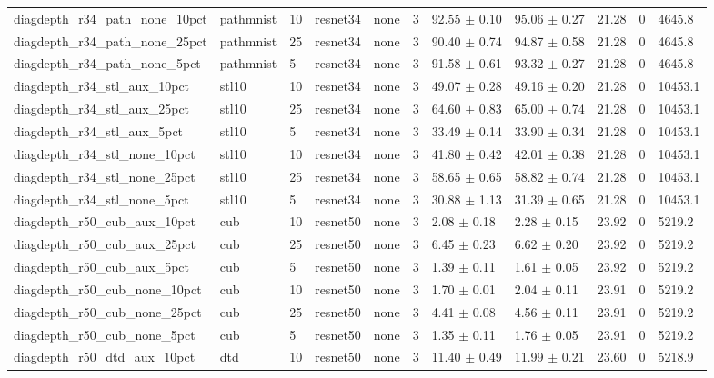\begin{tabular}{lllllllllll}
diagdepth_r34_path_none_10pct & pathmnist & 10 & resnet34 & none & 3 & 92.55 $\pm$ 0.10 & 95.06 $\pm$ 0.27 & 21.28 & 0 & 4645.8 \\
diagdepth_r34_path_none_25pct & pathmnist & 25 & resnet34 & none & 3 & 90.40 $\pm$ 0.74 & 94.87 $\pm$ 0.58 & 21.28 & 0 & 4645.8 \\
diagdepth_r34_path_none_5pct & pathmnist & 5 & resnet34 & none & 3 & 91.58 $\pm$ 0.61 & 93.32 $\pm$ 0.27 & 21.28 & 0 & 4645.8 \\
diagdepth_r34_stl_aux_10pct & stl10 & 10 & resnet34 & none & 3 & 49.07 $\pm$ 0.28 & 49.16 $\pm$ 0.20 & 21.28 & 0 & 10453.1 \\
diagdepth_r34_stl_aux_25pct & stl10 & 25 & resnet34 & none & 3 & 64.60 $\pm$ 0.83 & 65.00 $\pm$ 0.74 & 21.28 & 0 & 10453.1 \\
diagdepth_r34_stl_aux_5pct & stl10 & 5 & resnet34 & none & 3 & 33.49 $\pm$ 0.14 & 33.90 $\pm$ 0.34 & 21.28 & 0 & 10453.1 \\
diagdepth_r34_stl_none_10pct & stl10 & 10 & resnet34 & none & 3 & 41.80 $\pm$ 0.42 & 42.01 $\pm$ 0.38 & 21.28 & 0 & 10453.1 \\
diagdepth_r34_stl_none_25pct & stl10 & 25 & resnet34 & none & 3 & 58.65 $\pm$ 0.65 & 58.82 $\pm$ 0.74 & 21.28 & 0 & 10453.1 \\
diagdepth_r34_stl_none_5pct & stl10 & 5 & resnet34 & none & 3 & 30.88 $\pm$ 1.13 & 31.39 $\pm$ 0.65 & 21.28 & 0 & 10453.1 \\
diagdepth_r50_cub_aux_10pct & cub & 10 & resnet50 & none & 3 & 2.08 $\pm$ 0.18 & 2.28 $\pm$ 0.15 & 23.92 & 0 & 5219.2 \\
diagdepth_r50_cub_aux_25pct & cub & 25 & resnet50 & none & 3 & 6.45 $\pm$ 0.23 & 6.62 $\pm$ 0.20 & 23.92 & 0 & 5219.2 \\
diagdepth_r50_cub_aux_5pct & cub & 5 & resnet50 & none & 3 & 1.39 $\pm$ 0.11 & 1.61 $\pm$ 0.05 & 23.92 & 0 & 5219.2 \\
diagdepth_r50_cub_none_10pct & cub & 10 & resnet50 & none & 3 & 1.70 $\pm$ 0.01 & 2.04 $\pm$ 0.11 & 23.91 & 0 & 5219.2 \\
diagdepth_r50_cub_none_25pct & cub & 25 & resnet50 & none & 3 & 4.41 $\pm$ 0.08 & 4.56 $\pm$ 0.11 & 23.91 & 0 & 5219.2 \\
diagdepth_r50_cub_none_5pct & cub & 5 & resnet50 & none & 3 & 1.35 $\pm$ 0.11 & 1.76 $\pm$ 0.05 & 23.91 & 0 & 5219.2 \\
diagdepth_r50_dtd_aux_10pct & dtd & 10 & resnet50 & none & 3 & 11.40 $\pm$ 0.49 & 11.99 $\pm$ 0.21 & 23.60 & 0 & 5218.9 \\

\end{tabular}
